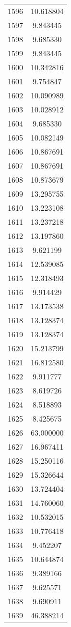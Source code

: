 \documentclass[12pt]{article}
\begin{document}
\begin{longtable}{@{}cc@{}}
1596 & 10.618804 \\
1597 & 9.843445 \\
1598 & 9.685330 \\
1599 & 9.843445 \\
1600 & 10.342816 \\
1601 & 9.754847 \\
1602 & 10.090989 \\
1603 & 10.028912 \\
1604 & 9.685330 \\
1605 & 10.082149 \\
1606 & 10.867691 \\
1607 & 10.867691 \\
1608 & 10.873679 \\
1609 & 13.295755 \\
1610 & 13.223108 \\
1611 & 13.237218 \\
1612 & 13.197860 \\
1613 & 9.621199 \\
1614 & 12.539085 \\
1615 & 12.318493 \\
1616 & 9.914429 \\
1617 & 13.173538 \\
1618 & 13.128374 \\
1619 & 13.128374 \\
1620 & 15.213799 \\
1621 & 16.812580 \\
1622 & 9.911777 \\
1623 & 8.619726 \\
1624 & 8.518893 \\
1625 & 8.425675 \\
1626 & 63.000000 \\
1627 & 16.967411 \\
1628 & 15.250116 \\
1629 & 15.326644 \\
1630 & 13.724404 \\
1631 & 14.760060 \\
1632 & 10.532015 \\
1633 & 10.776418 \\
1634 & 9.452207 \\
1635 & 10.644874 \\
1636 & 9.389166 \\
1637 & 9.625571 \\
1638 & 9.690911 \\
1639 & 46.388214 \\

\end{longtable}
\end{document}
